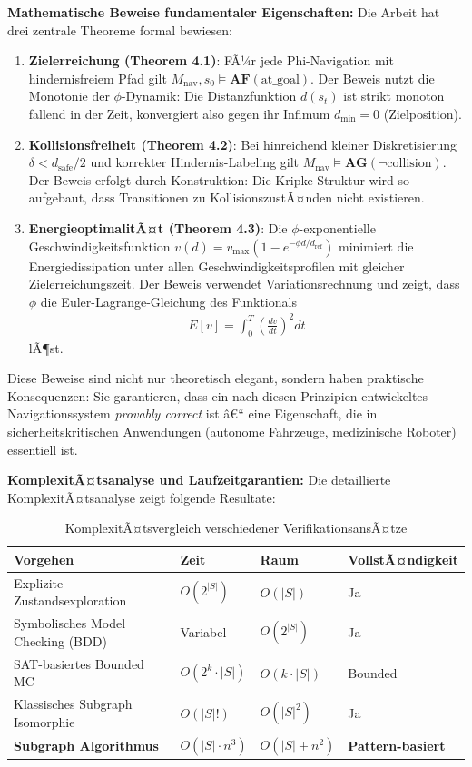 ﻿\documentclass[a4paper,12pt]{article}
\theoremstyle{definition}
\begin{document}
\textbf{Mathematische Beweise fundamentaler Eigenschaften:}
Die Arbeit hat drei zentrale Theoreme formal bewiesen:

\begin{enumerate}
	\item \textbf{Zielerreichung (Theorem 4.1)}: FÃ¼r jede Phi-Navigation mit hindernisfreiem Pfad gilt $M_{\text{nav}}, s_0 \models \mathbf{AF}(\text{at\_goal})$. Der Beweis nutzt die Monotonie der $\phi$-Dynamik: Die Distanzfunktion $d(s_t)$ ist strikt monoton fallend in der Zeit, konvergiert also gegen ihr Infimum $d_{\text{min}} = 0$ (Zielposition).
	
	\item \textbf{Kollisionsfreiheit (Theorem 4.2)}: Bei hinreichend kleiner Diskretisierung $\delta < d_{\text{safe}}/2$ und korrekter Hindernis-Labeling gilt $M_{\text{nav}} \models \mathbf{AG}(\neg\text{collision})$. Der Beweis erfolgt durch Konstruktion: Die Kripke-Struktur wird so aufgebaut, dass Transitionen zu KollisionszustÃ¤nden nicht existieren.
	
	\item \textbf{EnergieoptimalitÃ¤t (Theorem 4.3)}: Die $\phi$-exponentielle Geschwindigkeitsfunktion $v(d) = v_{\max}(1 - e^{-\phi d/d_{\text{ref}}})$ minimiert die Energiedissipation unter allen Geschwindigkeitsprofilen mit gleicher Zielerreichungszeit. Der Beweis verwendet Variationsrechnung und zeigt, dass $\phi$ die Euler-Lagrange-Gleichung des Funktionals
	\begin{align}
		E[v] = \int_0^T \left(\frac{dv}{dt}\right)^2 dt
	\end{align}
	lÃ¶st.
\end{enumerate}

Diese Beweise sind nicht nur theoretisch elegant, sondern haben praktische Konsequenzen: Sie garantieren, dass ein nach diesen Prinzipien entwickeltes Navigationssystem \textit{provably correct} ist â€“ eine Eigenschaft, die in sicherheitskritischen Anwendungen (autonome Fahrzeuge, medizinische Roboter) essentiell ist.

\textbf{KomplexitÃ¤tsanalyse und Laufzeitgarantien:}
Die detaillierte KomplexitÃ¤tsana\-lyse zeigt folgende Resultate:

\begin{table}[h]
	\centering
	\caption{KomplexitÃ¤tsvergleich verschiedener VerifikationsansÃ¤tze}
	\label{tab:complexity_final}
	\begin{tabular}{llll}
		\toprule
		Vorgehen & Zeit & Raum & VollstÃ¤ndigkeit \\
		\midrule
		Explizite Zustandsexploration & $O(2^{|S|})$ & $O(|S|)$ & Ja \\
		Symbolisches Model Checking (BDD) & Variabel & $O(2^{|S|})$ & Ja \\
		SAT-basiertes Bounded MC & $O(2^k \cdot |S|)$ & $O(k \cdot |S|)$ & Bounded \\
		Klassisches Subgraph Isomorphie & $O(|S|!)$ & $O(|S|^2)$ & Ja \\
		\textbf{Subgraph Algorithmus} & \textbf{$O(|S| \cdot n^3)$} & \textbf{$O(|S| + n^2)$} & \textbf{Pattern-basiert} \\
		\bottomrule
	\end{tabular}
\end{table}
\end{document}
